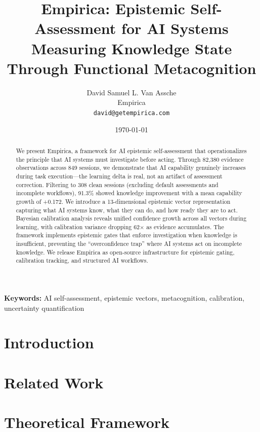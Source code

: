\documentclass[11pt,a4paper]{article}
\title{Empirica: Epistemic Self-Assessment for AI Systems\\
\large Measuring Knowledge State Through Functional Metacognition}
\author{
    David Samuel L. Van Assche\\
    Empirica\\
    \texttt{david@getempirica.com}
}
\date{\today}
\begin{document}
\maketitle

\begin{abstract}
We present Empirica, a framework for AI epistemic self-assessment that operationalizes the principle that AI systems must investigate before acting. Through 82,380 evidence observations across 849 sessions, we demonstrate that AI capability genuinely increases during task execution---the learning delta is real, not an artifact of assessment correction. Filtering to 308 clean sessions (excluding default assessments and incomplete workflows), 91.3\% showed knowledge improvement with a mean capability growth of +0.172. We introduce a 13-dimensional epistemic vector representation capturing what AI systems know, what they can do, and how ready they are to act. Bayesian calibration analysis reveals unified confidence growth across all vectors during learning, with calibration variance dropping 62$\times$ as evidence accumulates. The framework implements epistemic gates that enforce investigation when knowledge is insufficient, preventing the ``overconfidence trap'' where AI systems act on incomplete knowledge. We release Empirica as open-source infrastructure for epistemic gating, calibration tracking, and structured AI workflows.
\end{abstract}

\textbf{Keywords:} AI self-assessment, epistemic vectors, metacognition, calibration, uncertainty quantification

\section{Introduction}
\label{sec:introduction}


\section{Related Work}
\label{sec:related-work}


\section{Theoretical Framework}
\label{sec:theory}

\end{document}
